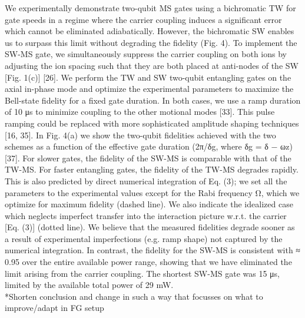 \documentclass[12pt]{iopart}
\begin{document}
    We experimentally demonstrate two-qubit MS gates using a bichromatic
    TW for gate speeds in a regime where the carrier coupling induces a
    significant error which cannot be eliminated adiabatically. However,
    the bichromatic SW enables us to surpass this limit without degrading
    the fidelity (Fig. 4). To implement the SW-MS gate, we simultaneously
    suppress the carrier coupling on both ions by adjusting the ion
    spacing such that they are both placed at anti-nodes of the SW
    [Fig. 1(c)] [26]. We perform the TW and SW two-qubit entangling gates
    on the axial in-phase mode and optimize the experimental parameters to
    maximize the Bell-state fidelity for a fixed gate duration. In both
    cases, we use a ramp duration of 10 μs to minimize coupling to the
    other motional modes [33]. This pulse ramping could be replaced with
    more sophisticated amplitude shaping techniques [16, 35]. In Fig. 4(a)
    we show the two-qubit fidelities achieved with the two schemes as a
    function of the effective gate duration (2π/δg, where δg = δ − ωz)
    [37]. For slower gates, the fidelity of the SW-MS is comparable with
    that of the TW-MS. For faster entangling gates, the fidelity of the
    TW-MS degrades rapidly. This is also predicted by direct numerical
    integration of Eq. (3); we set all the parameters to the experimental
    values except for the Rabi frequency Ω, which we optimize for maximum
    fidelity (dashed line). We also indicate the idealized case which
    neglects imperfect transfer into the interaction picture w.r.t. the
    carrier [Eq. (3)] (dotted line). We believe that the measured
    fidelities degrade sooner as a result of experimental imperfections
    (e.g. ramp shape) not captured by the numerical integration. In
    contrast, the fidelity for the SW-MS is consistent with ≈ 0.95 over
    the entire available power range, showing that we have eliminated the
    limit arising from the carrier coupling. The shortest SW-MS gate was
    15 μs, limited by the available total power of 29 mW. \\

    *Shorten conclusion and change in such a way that focusses on what to
    improve/adapt in FG setup\\
\end{document}
